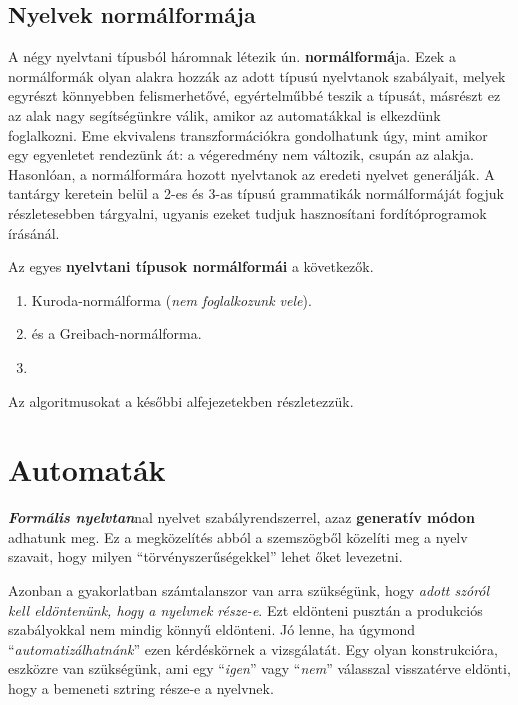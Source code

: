 \subsection{Nyelvek normálformája}

A négy nyelvtani típusból háromnak létezik ún. \textbf{normálformá}ja. Ezek a normálformák olyan alakra hozzák az adott típusú nyelvtanok szabályait, melyek egyrészt könnyebben felismerhetővé, egyértelműbbé teszik a típusát, másrészt ez az alak nagy segítségünkre válik, amikor az automatákkal is elkezdünk foglalkozni. Eme ekvivalens transzformációkra gondolhatunk úgy, mint amikor egy egyenletet rendezünk át: a végeredmény nem változik, csupán az alakja. Hasonlóan, a normálformára hozott nyelvtanok az eredeti nyelvet generálják. A tantárgy keretein belül a 2-es és 3-as típusú grammatikák normálformáját fogjuk részletesebben tárgyalni, ugyanis ezeket tudjuk hasznosítani fordítóprogramok írásánál.

Az egyes \textbf{nyelvtani típusok normálformái} a következők.

\begin{enumerate}[1. \textbf{típus.}]\bfseries
	\item Kuroda-normálforma (\textit{nem foglalkozunk vele}).
	\item {} és a Greibach-normálforma.
	\item {}
\end{enumerate}

Az algoritmusokat a későbbi alfejezetekben részletezzük.

\section{Automaták}

\textbf{\textit{Formális nyelvtan}}nal nyelvet szabályrendszerrel, azaz \textbf{generatív módon} adhatunk meg. Ez a megközelítés abból a szemszögből közelíti meg a nyelv szavait, hogy milyen ``törvényszerűségekkel'' lehet őket levezetni.

Azonban a gyakorlatban számtalanszor van arra szükségünk, hogy \textit{adott szóról kell eldöntenünk, hogy a nyelvnek része-e}. Ezt eldönteni pusztán a produkciós szabályokkal nem mindig könnyű eldönteni. Jó lenne, ha úgymond ``\textit{automatizálhatnánk}'' ezen kérdéskörnek a vizsgálatát. Egy olyan konstrukcióra, eszközre van szükségünk, ami egy ``\textit{igen}'' vagy ``\textit{nem}'' válasszal visszatérve eldönti, hogy a bemeneti sztring része-e a nyelvnek.

